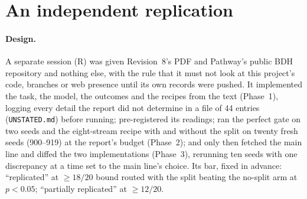 \documentclass[11pt]{article}
\begin{document}
\section{An independent replication}
\label{sec:replication}

\paragraph{Design.} A separate session (R) was given Revision~8's PDF and Pathway's public BDH repository and nothing else, with the rule that it must not look at this project's code, branches or web presence until its own records were pushed. It implemented the task, the model, the outcomes and the recipes from the text (Phase~1), logging every detail the report did not determine in a file of 44 entries (\texttt{UNSTATED.md}) before running; pre-registered its readings; ran the perfect gate on two seeds and the eight-stream recipe with and without the split on twenty fresh seeds (900--919) at the report's budget (Phase~2); and only then fetched the main line and diffed the two implementations (Phase~3), rerunning ten seeds with one discrepancy at a time set to the main line's choice. Its bar, fixed in advance: ``replicated'' at $\geq 18/20$ bound routed with the split beating the no-split arm at $p < 0.05$; ``partially replicated'' at $\geq 12/20$.
\end{document}
